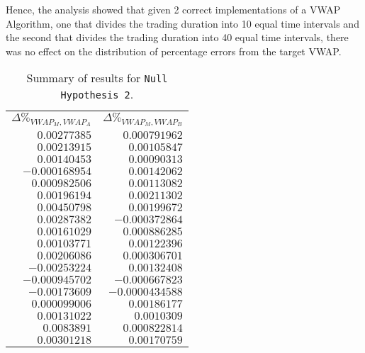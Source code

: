 Hence, the analysis showed that given 2 correct implementations of a VWAP Algorithm, one that divides the trading duration into 10 equal time intervals and the second that divides the trading duration into 40 equal time intervals, there was no effect on the distribution of percentage errors from the target VWAP.

\begin{table}[htbp]
\begin{center}
\begin{tabular}{ r r }
$\Delta\%_{VWAP_M, VWAP_A}$ & $\Delta\%_{VWAP_M, VWAP_B}$ \\
\cmidrule(r){1-2}

$0.00277385$	& $0.000791962$ 	\\
$0.00213915$	& $0.00105847$		\\
$0.00140453$	& $0.00090313$		\\
$-0.000168954$	& $0.00142062$		\\
$0.000982506$	& $0.00113082$		\\
$0.00196194$	& $0.00211302$		\\
$0.00450798$	& $0.00199672$		\\
$0.00287382$	& $-0.000372864$	\\
$0.00161029$	& $0.000886285$		\\
$0.00103771$	& $0.00122396$		\\
$0.00206086$	& $0.000306701$		\\
$-0.00253224$	& $0.00132408$		\\
$-0.000945702$	& $-0.000667823$	\\
$-0.00173609$	& $-0.0000434588$	\\	
$0.000099006$	& $0.00186177$		\\	
$0.00131022$	& $0.0010309$		\\
$0.0083891$		& $0.000822814$		\\
$0.00301218$	& $0.00170759$		\\	

\end{tabular}
\end{center}
\caption{Summary of results for \texttt{Null Hypothesis 2}.}
\label{Tables/Null-Hypothesis-2/Results}
\end{table}
